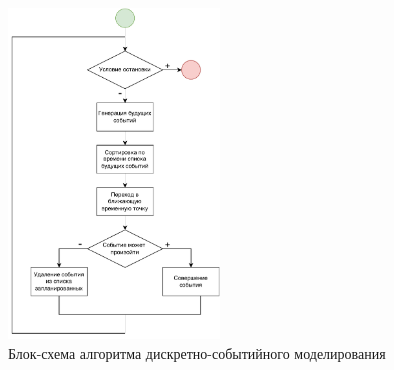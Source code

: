 \begin{figure}[H]
\centerline{\includegraphics[width=0.5\textwidth]{Images/BS.pdf}}
\caption{Блок-схема алгоритма дискретно-событийного моделирования}
\label{BS}
\end{figure}

